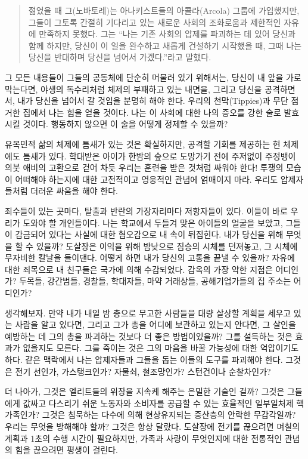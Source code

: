 \documentclass[10pt, b6paper, openany]{memoir}
\begin{document}
\begin{article}
\begin{quote}
젊었을 때 그(노바토레)는 아나키스트들의 아콜라(Arcola) 그룹에 가입했지만, 그들이 그토록 간절히 기다리고 있는 새로운 사회의 조화로움과 제한적인 자유에 만족하지 못했다. 그는 ``나는 기존 사회의 압제를 파괴하는 데 있어 당신과 함께 하지만, 당신이 이 일을 완수하고 새롭게 건설하기 시작했을 때, 그때 나는 당신을 반대하며 당신을 넘어서 가겠다.''라고 말했다.\cite{atc:enzo1950}
\end{quote}

그 모든 내용들이 그들의 공동체에 단순히 머물러 있기 위해서는, 당신이 내 앞을 가로막는다면, 야생의 독수리처럼 체제의 부패하고 있는 내면을, 그리고 당신을 공격하면서, 내가 당신을 넘어서 갈 것임을 분명히 해야 한다. 우리의 천막(Tippies)과 무단 점거한 집에서 나는 힘을 얻을 것이다. 나는 이 사회에 대한 나의 증오를 강한 술로 발효시킬 것이다. 행동하지 않으면 이 술을 어떻게 정제할 수 있을까? 

유목민적 삶의 체제에 틈새가 있는 것은 확실하지만, 공격할 기회를 제공하는 현 체제에도 틈새가 있다. 학대받은 아이가 한밤의 숲으로 도망가기 전에 주저없이 주정뱅이 의붓 애비의 고환으로 걷어 차듯 우리는 훈련을 받은 것처럼 싸워야 한다! 투쟁의 모습이 어떠해야 하는지에 대한 고전적이고 영웅적인 관념에 얽매이지 마라. 우리도 압제자들처럼 더러운 싸움을 해야 한다. 

죄수들이 있는 곳마다, 탈출과 반란의 가장자리마다 저항자들이 있다. 이들이 바로 우리가 도와야 할 개인들이다. 나는 학교에서 두들겨 맞은 아이들의 얼굴을 보았고, 그들이 감금되어 있다는 사실에 대한 혐오감으로 내 속이 뒤집힌다. 내가 당신을 위해 무엇을 할 수 있을까? 도살장은 이익을 위해 밤낮으로 짐승의 시체를 던져놓고, 그 시체에 무자비한 칼날을 들이댄다. 어떻게 하면 내가 당신의 고통을 끝낼 수 있을까? 자유에 대한 죄목으로 내 친구들은 국가에 의해 수감되었다. 감옥의 가장 약한 지점은 어디인가? 두목들, 강간범들, 경찰들, 학대자들, 마약 거래상들, 공해기업가들의 집 주소는 어디인가?

생각해보자. 만약 내가 내일 밤 총으로 무고한 사람들을 대량 살상할 계획을 세우고 있는 사람을 알고 있다면, 그리고 그가 총을 어디에 보관하고 있는지 안다면, 그 살인을 예방하는 데 그의 총을 파괴하는 것보다 더 좋은 방법이있을까? 그를 설득하는 것은 효과가 없을지도 모른다. 그를 죽이는 것은 그의 마음을 바꿀 가능성에 대한 억압이기도 하다. 같은 맥락에서 나는 압제자들과 그들을 돕는 이들의 도구를 파괴해야 한다. 그것은 전기 선인가, 가스탱크인가? 자물쇠, 철조망인가? 스턴건이나 순찰차인가?  

더 나아가, 그것은 엘리트들의 위장을 지속케 해주는 은밀한 기술인 걸까? 그것은 그들에게 값싸고 다스리기 쉬운 노동자와 소비자를 공급할 수 있는 효율적인 일부일처제 핵가족인가? 그것은 침묵하는 다수에 의해 현상유지되는 중산층의 안락한  무감각일까? 우리는 무엇을 방해해야 할까? 그것은 항상 달랐다. 도살장에 전기를 끊으려면 며칠의 계획과 1초의 수행 시간이 필요하지만, 가족과 사랑이 무엇인지에 대한 전통적인 관념의 힘을 끊으려면 평생이 걸린다. 


\end{article}
\end{document}
